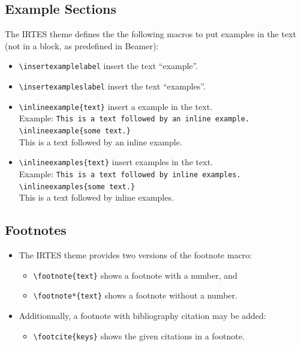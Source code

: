 \documentclass[english,circlenumberstyle]{irtesbeamer}
\begin{document}
\subsection{Example Sections}
\begin{frame}{\subsecname}
	\begin{small}
	The IRTES theme defines the the following macros to put examples in the text (not in a block, as predefined in Beamer):
	\begin{itemize}
	\item \texttt{{\textbackslash}insertexamplelabel} insert the text ``example''.
	\item \texttt{{\textbackslash}insertexampleslabel} insert the text ``examples''.
	\item \texttt{{\textbackslash}inlineexample\{text\}} insert a example in the text. \\
		Example: \texttt{This is a text followed by an inline example. {\textbackslash}inlineexample\{some text.\}} \\
		This is a text followed by an inline example. 
	\item \texttt{{\textbackslash}inlineexamples\{text\}} insert examples in the text. \\
		Example: \texttt{This is a text followed by inline examples. {\textbackslash}inlineexamples\{some text.\}} \\
		This is a text followed by inline examples. 
	\end{itemize}
	\end{small}
\end{frame}


\subsection{Footnotes}
\begin{frame}{\subsecname}
	\begin{itemize}
	\item The IRTES theme provides two versions of the footnote macro:
		\begin{itemize}
		\item \texttt{{\textbackslash}footnote\{text\}} shows a footnote with a number, and
		\item \texttt{{\textbackslash}footnote*\{text\}} shows a footnote without a number.
		\end{itemize}
	\item Additionnally, a footnote with bibliography citation may be added:
		\begin{itemize}
		\item \texttt{{\textbackslash}footcite\{keys\}} shows the given citations in a footnote.
		\end{itemize}
	\end{itemize}
\end{frame}
\end{document}
